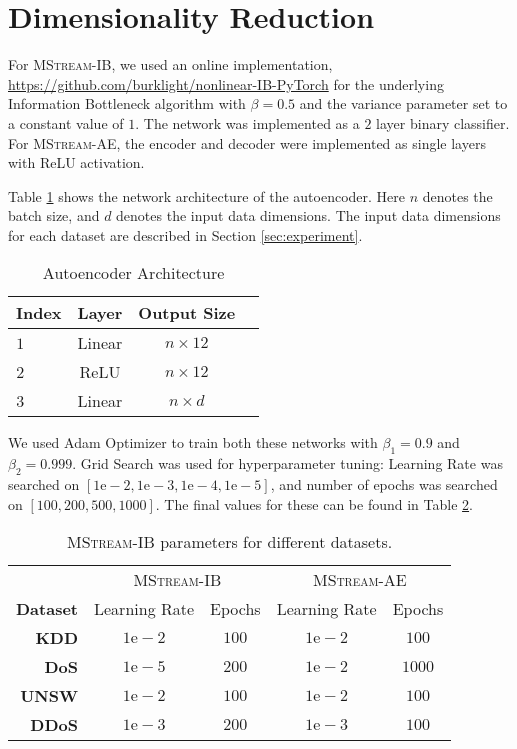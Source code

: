 \documentclass[sigconf]{acmart}
\newcommand{\method}{\textsc{MStream}}
\begin{document}
\section{Dimensionality Reduction}
\label{sec:app1}
For \method-IB, we used an online implementation, \url{https://github.com/burklight/nonlinear-IB-PyTorch} for the underlying Information Bottleneck algorithm with $\beta=0.5$ and the variance parameter set to a constant value of $1$. The network was implemented as a $2$ layer binary classifier. For \method-AE, the encoder and decoder were implemented as single layers with ReLU activation.

Table \ref{tab:aearch} shows the network architecture of the autoencoder. Here $n$ denotes the batch size, and $d$ denotes the input data dimensions. The input data dimensions for each dataset are described in Section \ref{sec:experiment}.  
\begin{table}[!htb]
\begin{center}
\caption{Autoencoder Architecture}
\label{tab:aearch}
\begin{tabular}{@{}rccc@{}}
\toprule
\textbf{Index} & \textbf{Layer} & \textbf{Output Size}  \\ \midrule
$1$ \ \ \ \ & Linear & $n\times12$\\
$2$ \ \ \ \ & ReLU & $n\times12$\\
$3$ \ \ \ \ & Linear & $n\times d$\\
\bottomrule
\end{tabular}
\end{center}
\end{table}

We used Adam Optimizer to train both these networks with $\beta_1 = 0.9$ and $\beta_2 = 0.999$. Grid Search was used for hyperparameter tuning:  Learning Rate was searched on $[1\mathrm{e}-2, 1\mathrm{e}-3, 1\mathrm{e}-4, 1\mathrm{e}-5]$, and number of epochs was searched on $[100, 200, 500, 1000]$. The final values for these  can be found in Table \ref{tab:ibparam}.
\begin{table}[!htb]
\centering
\caption{\method-IB parameters for different datasets.}
\label{tab:ibparam}
\begin{tabular}{@{}rcccc@{}}
\toprule
& \multicolumn{2}{c}{\method-IB} & \multicolumn{2}{c}{\method-AE} \\
 \textbf{Dataset} & Learning Rate  &  Epochs & Learning Rate  & Epochs  \\ \midrule
 \textbf{KDD} & $1\mathrm{e}-2$ & $100$ & $1\mathrm{e}-2$ & $100$\\
 \textbf{DoS} & $1\mathrm{e}-5$ &  $200$ & $1\mathrm{e}-2$ &  $1000$\\
 \textbf{UNSW} & $1\mathrm{e}-2$ & $100$ & $1\mathrm{e}-2$ & $100$\\
\textbf{DDoS} & $1\mathrm{e}-3$ & $200$ & $1\mathrm{e}-3$ & $100$\\
\bottomrule
\end{tabular}
\end{table}
\end{document}
